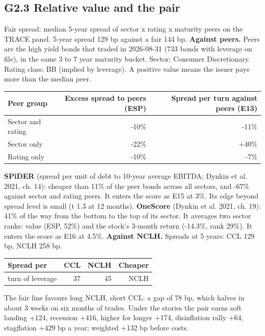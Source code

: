 \documentclass[11pt,a4paper]{article}
\begin{document}
\subsection*{G2.3 Relative value and the pair}
Fair spread: median 5-year spread of sector x rating x maturity peers on the TRACE panel. 5-year spread 129 bp against a fair 144 bp.
\textbf{Against peers.} Peers are the high yield bonds that traded in 2026-08-31 (733 bonds with leverage on file), in the same 3 to 7 year maturity bucket. Sector: Consumer Discretionary. Rating class: BB (implied by leverage). A positive value means the issuer pays more than the median peer.
\begin{center}\footnotesize\setlength{\tabcolsep}{3.5pt}\begin{tabular}{@{}lrr@{}}\toprule
Peer group & Excess spread to peers (ESP) & Spread per turn against peers (E13) \\\midrule
Sector and rating & -10\% & -11\% \\
Sector only & -22\% & +40\% \\
Rating only & -10\% & -7\% \\
\bottomrule\end{tabular}\end{center}
\textbf{SPiDER} (spread per unit of debt to 10-year average EBITDA; Dynkin et al. 2021, ch. 14): cheaper than 11\% of the peer bonds across all sectors, and -67\% against sector and rating peers. It enters the score as E15 at 3\%. Its edge beyond spread level is small (t 1.3 at 12 months).
\textbf{OneScore} (Dynkin et al. 2021, ch. 19): 41\% of the way from the bottom to the top of its sector. It averages two sector ranks: value (ESP, 52\%) and the stock's 3-month return (-14.3\%, rank 29\%). It enters the score as E16 at 4.5\%.
\textbf{Against NCLH.} Spreads at 5 years: CCL 129 bp, NCLH 258 bp.
\begin{center}\footnotesize\setlength{\tabcolsep}{3.5pt}\begin{tabular}{@{}lrrr@{}}\toprule
Spread per & CCL & NCLH & Cheaper \\\midrule
turn of leverage & 37 & 45 & NCLH \\
\bottomrule\end{tabular}\end{center}
The fair line favours long NCLH, short CCL: a gap of 78 bp, which halves in about 3 weeks on six months of trades. Under the stories the pair earns soft landing +124, recession +416, higher for longer +174, disinflation rally +64, stagflation +429 bp a year; weighted +132 bp before costs.
\end{document}
